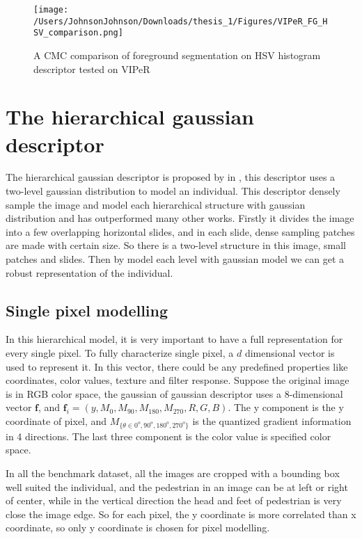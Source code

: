 \begin{figure}[H]
\centering
\texttt{[image: /Users/JohnsonJohnson/Downloads/thesis\_1/Figures/VIPeR\_FG\_HSV\_comparison.png]}
\caption{A CMC comparison of foreground segmentation on HSV histogram descriptor tested on VIPeR}
\vspace{0em}
\end{figure} 


\section{The hierarchical gaussian descriptor}

The hierarchical gaussian descriptor is proposed by in  \cite{GOGpaper}, this descriptor uses a two-level gaussian distribution to model an individual. This descriptor densely sample the image and model each hierarchical structure with gaussian distribution and has outperformed many other works. Firstly it divides the image into a few overlapping horizontal slides, and in each slide, dense sampling patches are made with certain size. So there is a  two-level structure in this image, small patches and slides. Then by model each level with gaussian model we can get a robust representation of the individual.
\subsection{Single pixel modelling}

In this hierarchical model, it is very important to have a full representation for every single pixel. To fully characterize single pixel, a $d$ dimensional vector is used to represent it. In this vector, there could be any predefined properties like coordinates, color values, texture and filter response. Suppose the original image is in RGB color space, the gaussian of gaussian descriptor uses a 8-dimensional vector $\textbf{f}$, and 
$\bm{f}_i = (y,M_0,M_{90},M_{180},M_{270},R,G,B)$.
The y component is the y coordinate of pixel, and $M_{\{{\theta}\in{0^o,90^o,180^o,270^o}\}}$ is the quantized gradient information in 4 directions. The last three component is the color value is specified color space.

In all the benchmark dataset, all the images are cropped with a bounding box well suited the individual, and the pedestrian in an image can be at left or right of center, while in the vertical direction the head and feet of pedestrian is very close the image edge. So for each pixel, the y coordinate is more correlated than x coordinate, so only y coordinate is chosen for pixel modelling. 

